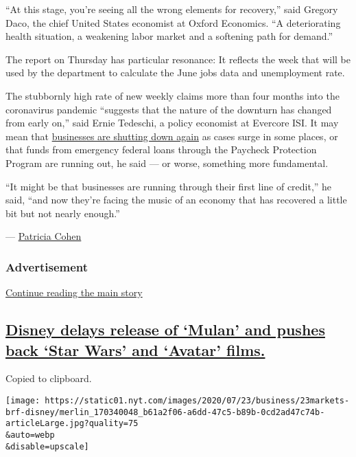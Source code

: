 ``At this stage, you're seeing all the wrong elements for recovery,''
said Gregory Daco, the chief United States economist at Oxford
Economics. ``A deteriorating health situation, a weakening labor market
and a softening path for demand.''

The report on Thursday has particular resonance: It reflects the week
that will be used by the department to calculate the June jobs data and
unemployment rate.

The stubbornly high rate of new weekly claims more than four months into
the coronavirus pandemic ``suggests that the nature of the downturn has
changed from early on,'' said Ernie Tedeschi, a policy economist at
Evercore ISI. It may mean that
\href{https://www.nytimes.com/2020/07/15/business/economy/economic-recovery-coronavirus-resurgence.html}{businesses
are shutting down again} as cases surge in some places, or that funds
from emergency federal loans through the Paycheck Protection Program are
running out, he said --- or worse, something more fundamental.

``It might be that businesses are running through their first line of
credit,'' he said, ``and now they're facing the music of an economy that
has recovered a little bit but not nearly enough.''

--- \href{https://www.nytimes.com/by/patricia-cohen}{Patricia Cohen}

\hypertarget{advertisement}{%
\subsubsection{Advertisement}\label{advertisement}}

\protect\hyperlink{after-dfp-ad-mid1}{Continue reading the main story}

\hypertarget{disney-delays-release-of-mulan-and-pushes-back-star-wars-and-avatar-films}{%
\subsection{\texorpdfstring{\protect\hyperlink{disney-delays-release-of-mulan-and-pushes-back-star-wars-and-avatar-films}{Disney
delays release of `Mulan' and pushes back `Star Wars' and `Avatar'
films.}}{Disney delays release of `Mulan' and pushes back `Star Wars' and `Avatar' films.}}\label{disney-delays-release-of-mulan-and-pushes-back-star-wars-and-avatar-films}}

Copied to clipboard.

\texttt{[image: https://static01.nyt.com/images/2020/07/23/business/23markets-brf-disney/merlin\_170340048\_b61a2f06-a6dd-47c5-b89b-0cd2ad47c74b-articleLarge.jpg?quality=75\\\&auto=webp\\\&disable=upscale]}

